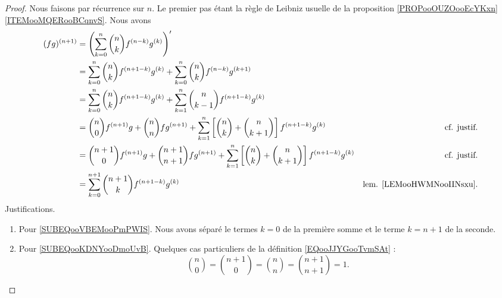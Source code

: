 \begin{proof}
	Nous faisons par récurrence sur \( n\). Le premier pas étant la règle de Leibniz usuelle de la proposition \ref{PROPooOUZOooEcYKxn}\ref{ITEMooMQERooBCqnvS}. Nous avons
	\begin{subequations}
		\begin{align}
			(fg)^{(n+1)} & =\left( \sum_{k=0}^n\binom{ n }{ k }f^{(n-k)}g^{(k)}  \right)'                                                                                                                                    \\
			             & =\sum_{k=0}^n\binom{ n }{ k }f^{(n+1-k)}g^{(k)}+\sum_{k=0}^n\binom{ n }{ k }f^{(n-k)}g^{(k+1)}                                                                                                    \\
			             & =\sum_{k=0}^n\binom{ n }{ k }f^{(n+1-k)}g^{(k)}+\sum_{k=1}^n\binom{ n }{ k-1 }f^{(n+1-k)}g^{(k)}                                                                                                  \\
			             & =\binom{ n }{ 0 }f^{(n+1)}g+\binom{ n }{ n }fg^{(n+1)}+\sum_{k=1}^{n}\left[  \binom{ n }{ k }+\binom{ n }{ k+1 }  \right]f^{(n+1-k)}g^{(k)}       & \text{cf. justif.}	\label{SUBEQooVBEMooPmPWIS} \\
			             & =\binom{ n+1 }{ 0 }f^{(n+1)}g+\binom{ n+1 }{ n+1 }fg^{(n+1)}+\sum_{k=1}^{n}\left[  \binom{ n }{ k }+\binom{ n }{ k+1 }  \right]f^{(n+1-k)}g^{(k)} & \text{cf. justif.}	\label{SUBEQooKDNYooDmoUvB} \\
			             & =\sum_{k=0}^{n+1}\binom{ n+1 }{ k }f^{(n+1-k)}g^{(k)}                                                                                             & \text{lem. \ref{LEMooHWMNooIINsxu}}.
		\end{align}
	\end{subequations}
	Justifications.
	\begin{enumerate}
		\item
		      Pour \eqref{SUBEQooVBEMooPmPWIS}. Nous avons séparé le termes \( k=0\) de la première somme et le terme \( k=n+1\) de la seconde.
		\item
		      Pour \eqref{SUBEQooKDNYooDmoUvB}. Quelques cas particuliers de la définition \eqref{EQooJJYGooTvmSAt} :
		      \begin{equation}
			      \binom{ n }{ 0 }=\binom{ n+1 }{ 0 }=\binom{ n }{ n }=\binom{ n+1 }{ n+1 }=1.
		      \end{equation}
	\end{enumerate}
\end{proof}

